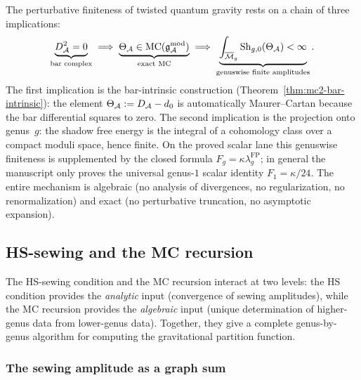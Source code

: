 \begin{remark}
\label{rem:thqg-I-finiteness-summary}
The perturbative finiteness of twisted quantum gravity rests on a chain
of three implications:
\begin{equation}\label{eq:thqg-I-chain}
\underbrace{D_{\mathcal{A}}^2 = 0}_{\text{bar complex}} \;\Longrightarrow\; \underbrace{\Theta_{\mathcal{A}} \in \mathrm{MC}(\mathfrak{g}_{\mathcal{A}}^{\mathrm{mod}})}_{\text{exact MC}} \;\Longrightarrow\; \underbrace{\int_{\overline{\mathcal{M}}_g}\operatorname{Sh}_{g,0}(\Theta_{\mathcal{A}}) < \infty}_{\text{genuswise finite amplitudes}}.
\end{equation}
The first implication is the bar-intrinsic construction
(Theorem~\ref{thm:mc2-bar-intrinsic}): the element
$\Theta_{\mathcal{A}} := D_{\mathcal{A}} - d_0$ is automatically Maurer--Cartan because the
bar differential squares to zero. The second implication is the
projection onto genus~$g$: the shadow free energy is the integral of a
cohomology class over a compact moduli space, hence finite. On the
proved scalar lane this genuswise finiteness is supplemented by the
closed formula $F_g=\kappa\lambda_g^{\mathrm{FP}}$; in general the
manuscript only proves the universal genus-$1$ scalar identity
$F_1=\kappa/24$. The entire mechanism is algebraic (no analysis of
divergences, no regularization, no renormalization) and exact (no
perturbative truncation, no asymptotic expansion).
\end{remark}



\subsection{HS-sewing and the MC recursion}
\label{subsec:thqg-I-hs-mc-recursion}

The HS-sewing condition and the MC recursion interact at two levels: the HS condition provides the \emph{analytic} input (convergence of sewing amplitudes), while the MC recursion provides the \emph{algebraic} input (unique determination of higher-genus data from lower-genus data). Together, they give a complete genus-by-genus algorithm for computing the gravitational partition function.

\subsubsection{The sewing amplitude as a graph sum}

